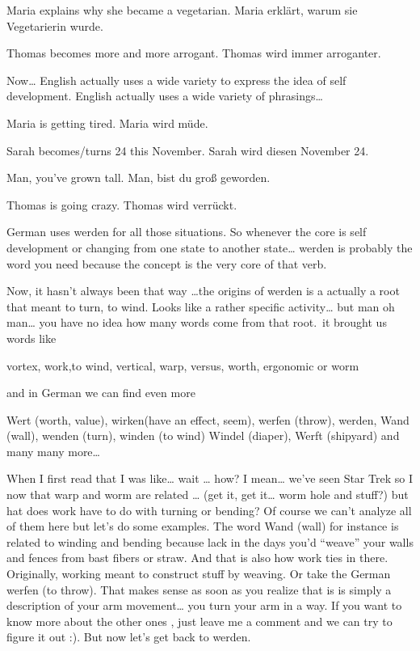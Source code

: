 \documentclass[a4paper,12pt]{article}
\begin{document}
\begin{adjustwidth}{2em}{0pt}
\begin{adjustwidth}{3em}{0pt}
    Maria explains why she became a vegetarian.
    Maria erklärt, warum sie Vegetarierin wurde.

    Thomas becomes more and more arrogant.
    Thomas wird immer arroganter.

Now… English actually uses a wide variety to express the idea of self development. English actually uses a wide variety of phrasings… 

    Maria is getting tired.
    Maria wird müde.

    Sarah becomes/turns 24 this November.
    Sarah wird diesen November 24.

    Man, you’ve grown tall.
    Man, bist du groß geworden.

    Thomas is going crazy.
    Thomas wird verrückt.

German uses werden for all those situations. So whenever the core is self development or changing from one state to another state…  werden is probably the word you need because the concept is the very core of that verb.

Now, it hasn’t always been that way \ldots the origins of werden is a actually a
root that meant to turn, to wind. Looks like a rather specific activity… but man
oh man… you have no idea how many words come from that root.\ it brought us words
like

    vortex, work,to wind, vertical, warp, versus,
    worth, ergonomic or worm

and in German we can find even more

    Wert (worth, value), wirken(have an effect, seem), werfen (throw),
    werden, Wand (wall), wenden (turn), winden (to wind)
    Windel (diaper), Werft (shipyard) and many many more…

When I first read that I was like… wait … how? I mean… we’ve seen Star Trek so I  now that warp and worm are related … (get it, get it… worm hole and stuff?) but  hat does work have to do with turning or bending?
Of course we can’t analyze all of them here but let’s do some examples.  The word Wand (wall) for instance is related to winding and bending because  lack in the days you’d “weave” your walls and fences from bast fibers or straw. And that is also how work ties in there. Originally, working meant to construct stuff by weaving. Or take the German werfen (to throw). That makes sense as soon as you realize that is is simply a description of your arm movement… you turn your arm in a way.
If you want to know more about the other ones , just leave me a comment and we can try to figure it out :). But now let’s get back to werden.


\end{adjustwidth}
\end{adjustwidth}
\end{document}
